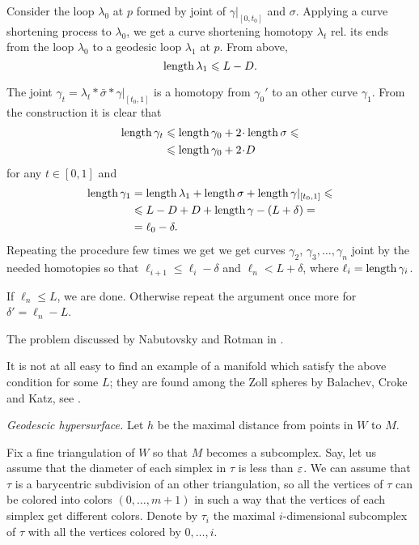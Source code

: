 Consider the loop $\lambda_0$ at $p$
formed by joint of $\gamma|_{[0,t_0]}$ and $\sigma$.
Applying a curve shortening process to $\lambda_0$, 
we get a curve shortening homotopy $\lambda_t$
rel. its ends 
from the loop $\lambda_0$ to a geodesic loop $\lambda_1$ at $p$.
From above, 
\[\operatorname{\rm length}\lambda_1\leqslant L-D.\]

The joint $\gamma_t=\lambda_t*\bar\sigma*\gamma|_{[t_0,1]}$
is a homotopy
from $\gamma_0'$ to an other curve $\gamma_1$.
From the construction it is clear that 
\begin{align*}
 \length \gamma_t&\le \length \gamma_0+2\cdot \length\sigma\le
 \\
 &\le \length \gamma_0+2\cdot D
\end{align*}
for any $t\in[0,1]$
and 
\begin{align*}
 \operatorname{\rm length} \gamma_1&=\operatorname{\rm length}\lambda_1+\operatorname{\rm length}\sigma+\operatorname{\rm length}\gamma|_{[t_0,1]}\leqslant
\\ &\leqslant L-D+D+\operatorname{\rm length}\gamma-(L+\delta)=
\\ &=\ell_0 -\delta.
\end{align*}
Repeating the procedure few times we get we get curves $\gamma_2$, $\gamma_3,\dots,\gamma_n$
joint by the needed homotopies so that 
$\ell_{i+1}\le\ell_i-\delta$ and $\ell_n< L+\delta$,
where $\ell_i=\operatorname{\rm length}\gamma_i$.

If $\ell_n\le L$, we are done.
Otherwise repeat the argument once more for $\delta'=\ell_n-L$.

The problem discussed by Nabutovsky and Rotman in \cite{nabutovsky-rotman}.

It is not at all easy to find an example of a manifold  which satisfy the above condition for some $L$;
they are found among the Zoll spheres
by Balachev, Croke and Katz, 
see \cite{balacheff-croke-katz}.

\textit{Geodescic hypersurface.}
Let $h$ be the maximal distance from points in $W$ to $M$.

Fix a fine triangulation of $W$ 
so that $M$ becomes a subcomplex.
Say, let us assume that the diameter of each simplex in $\tau$ is less than 
$\varepsilon$.
We can assume that $\tau$ is a barycentric subdivision of an other triangulation, so all the vertices of $\tau$ can be colored into colors $(0,\dots, m+1)$
in such a way that the vertices of each simplex 
get different colors.
Denote by $\tau_i$ the maximal $i$-dimensional subcomplex of $\tau$ 
with all the vertices colored by $0,\dots, i$.

